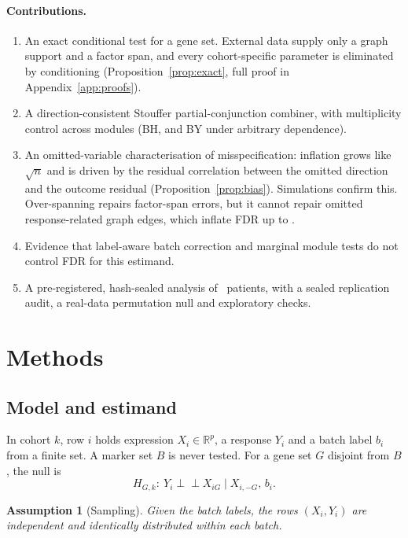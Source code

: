 \documentclass[10pt,twocolumn,letterpaper]{article}
\newtheorem{assumption}{Assumption}
\theoremstyle{remark}
\newcommand{\indep}{\perp\!\!\!\perp}
\begin{document}
\paragraph{Contributions.}
\begin{enumerate}
  \item An exact conditional test for a gene set. External data supply only a graph support and a factor span, and every cohort-specific parameter is eliminated by conditioning (Proposition~\ref{prop:exact}, full proof in Appendix~\ref{app:proofs}).
  \item A direction-consistent Stouffer partial-conjunction combiner, with multiplicity control across modules (BH, and BY under arbitrary dependence).
  \item An omitted-variable characterisation of misspecification: inflation grows like $\sqrt n$ and is driven by the residual correlation between the omitted direction and the outcome residual (Proposition~\ref{prop:bias}). Simulations confirm this. Over-spanning repairs factor-span errors, but it cannot repair omitted response-related graph edges, which inflate FDR up to \advNewDropHi.
  \item Evidence that label-aware batch correction and marginal module tests do not control FDR for this estimand.
  \item A pre-registered, hash-sealed analysis of \nICI\ patients, with a sealed replication audit, a real-data permutation null and exploratory checks.
\end{enumerate}

\section{Methods}

\subsection{Model and estimand}

In cohort $k$, row $i$ holds expression $X_i\in\mathbb R^p$, a response $Y_i$ and a batch label $b_i$ from a finite set. A marker set $B$ is never tested. For a gene set $G$ disjoint from $B$, the null is
\[
H_{G,k}:\ Y_i \indep X_{iG} \mid X_{i,-G},\, b_i .
\]

\begin{assumption}[Sampling]\label{as:iid}
Given the batch labels, the rows $(X_i,Y_i)$ are independent and identically distributed within each batch.
\end{assumption}
\end{document}
